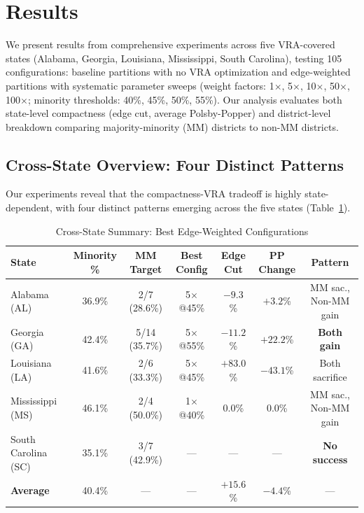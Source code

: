 
\section{Results}

We present results from comprehensive experiments across five VRA-covered states (Alabama, Georgia, Louisiana, Mississippi, South Carolina), testing 105 configurations: baseline partitions with no VRA optimization and edge-weighted partitions with systematic parameter sweeps (weight factors: 1$\times$, 5$\times$, 10$\times$, 50$\times$, 100$\times$; minority thresholds: 40\%, 45\%, 50\%, 55\%). Our analysis evaluates both state-level compactness (edge cut, average Polsby-Popper) and district-level breakdown comparing majority-minority (MM) districts to non-MM districts.

\subsection{Cross-State Overview: Four Distinct Patterns}

Our experiments reveal that the compactness-VRA tradeoff is highly state-dependent, with four distinct patterns emerging across the five states (Table~\ref{tab:cross-state-summary}).

\begin{table}[htbp]
\centering
\caption{Cross-State Summary: Best Edge-Weighted Configurations}
\label{tab:cross-state-summary}
\begin{tabular}{lcccccc}
\toprule
\textbf{State} & \textbf{Minority \%} & \textbf{MM Target} & \textbf{Best Config} & \textbf{Edge Cut} & \textbf{PP Change} & \textbf{Pattern} \\
\midrule
Alabama (AL)    & 36.9\% & 2/7 (28.6\%) & 5$\times$@45\% & $-9.3$\% & $+3.2$\% & MM sac., Non-MM gain \\
Georgia (GA)    & 42.4\% & 5/14 (35.7\%) & 5$\times$@55\% & $-11.2$\% & $+22.2$\% & \textbf{Both gain} \\
Louisiana (LA)  & 41.6\% & 2/6 (33.3\%) & 5$\times$@45\% & $+83.0$\% & $-43.1$\% & Both sacrifice \\
Mississippi (MS) & 46.1\% & 2/4 (50.0\%) & 1$\times$@40\% & $0.0$\% & $0.0$\% & MM sac., Non-MM gain \\
South Carolina (SC) & 35.1\% & 3/7 (42.9\%) & --- & --- & --- & \textbf{No success} \\
\midrule
\textbf{Average} & 40.4\% & --- & --- & $+15.6$\% & $-4.4$\% & --- \\
\bottomrule
\end{tabular}
\end{table}

